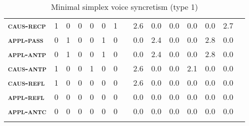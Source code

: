 \begin{table}[b]
\begin{tabularx}{\textwidth}{lrrrrrrlrrrrrrl}
		\textbf{\textsc{caus-recp}} & 1 & 0 & 0 & 0 & 0 & 1 & & 2.6 & 0.0 & 0.0 & 0.0 & 0.0 & 2.7 & \\
		\textbf{\textsc{appl-pass}} & 0 & 1 & 0 & 0 & 1 & 0 & & 0.0 & 2.4 & 0.0 & 0.0 & 2.8 & 0.0 & \\
		\textbf{\textsc{appl-antp}} & 0 & 1 & 0 & 0 & 1 & 0 & & 0.0 & 2.4 & 0.0 & 0.0 & 2.8 & 0.0 & \\
		\textbf{\textsc{caus-antp}} & 1 & 0 & 0 & 1 & 0 & 0 & & 2.6 & 0.0 & 0.0 & 2.1 & 0.0 & 0.0 & \\
		\textbf{\textsc{caus-refl}} & 1 & 0 & 0 & 0 & 0 & 0 & & 2.6 & 0.0 & 0.0 & 0.0 & 0.0 & 0.0 & \\
		\textbf{\textsc{appl-refl}} & 0 & 0 & 0 & 0 & 0 & 0 & & 0.0 & 0.0 & 0.0 & 0.0 & 0.0 & 0.0 & \\
		\textbf{\textsc{appl-antc}} & 0 & 0 & 0 & 0 & 0 & 0 & & 0.0 & 0.0 & 0.0 & 0.0 & 0.0 & 0.0 & \\
		\lspbottomrule
	\end{tabularx}
	\caption{Minimal simplex voice syncretism (type 1)}
	\label{tab:ch6:voice-syncretism-macroarea-minimal}
\end{table}

